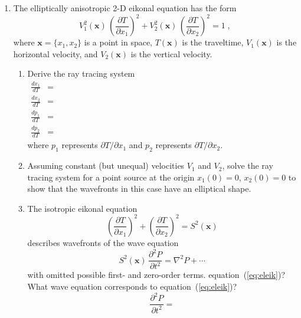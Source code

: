 \begin{enumerate}
\item The elliptically anisotropic 2-D eikonal
  equation has the form
  \begin{equation}
    \label{eq:eleik}
    V_1^2(\mathbf{x})\,\left(\frac{\partial T}{\partial x_1}\right)^2 +
    V_2^2(\mathbf{x})\,\left(\frac{\partial T}{\partial x_2}\right)^2 = 1\;,
  \end{equation}
  where $\mathbf{x}=\{x_1,x_2\}$ is a point in space, $T(\mathbf{x})$
  is the traveltime, $V_1(\mathbf{x})$ is the horizontal velocity, and
  $V_2(\mathbf{x})$ is the vertical velocity.
  \begin{enumerate}
  \item Derive the ray tracing system
    \begin{eqnarray}
      \label{eq:xt}
      \frac{d x_1}{d T} & = & \hspace{5in} \\
      \label{eq:zt}
      \frac{d x_2}{d T} & = & \\
      \label{eq:pxt}
      \frac{d p_1}{d T} & = & \\
      \label{eq:pzt}
      \frac{d p_2}{d T} & = & 
    \end{eqnarray}
    where $p_1$ represents $\partial T/\partial x_1$ and 
    $p_2$ represents $\partial T/\partial x_2$.
  \item Assuming constant (but unequal) velocities $V_1$ and $V_2$,
    solve the ray tracing system for a point source at the origin
    $x_1(0)=0$, $x_2(0)=0$ to show that the wavefronts in this case
    have an elliptical shape.
  \item The isotropic eikonal equation
    \begin{equation}
      \label{eq:iso}
      \left(\frac{\partial T}{\partial x_1}\right)^2 +
      \left(\frac{\partial T}{\partial x_2}\right)^2 = S^2(\mathbf{x})
    \end{equation}
    describes wavefronts of the wave equation
    \begin{equation}
      \label{eq:isowave}
    S^2(\mathbf{x})\,\frac{\partial^2 P}{\partial t^2} =
    \nabla^2 P + \cdots
  \end{equation}
  with omitted possible first- and zero-order terms. 
  equation~(\ref{eq:eleik})? What wave equation corresponds to equation~(\ref{eq:eleik})?
  \begin{equation}
    {\frac{\partial^2 P}{\partial t^2}} =
    \label{eq:anisowave}
  \end{equation}
  \end{enumerate}
\end{enumerate}

